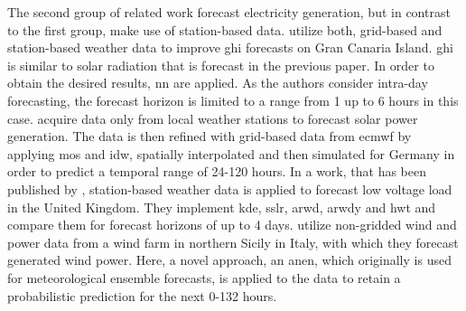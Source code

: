 The second group of related work forecast electricity generation, but in contrast to the first group, make use of station-based data. \Eg {} utilize both, grid-based and station-based weather data to improve \gls{ghi} forecasts on Gran Canaria Island. \gls{ghi} is similar to solar radiation that is forecast in the previous paper. In order to obtain the desired results, \gls{nn} are applied. As the authors consider intra-day forecasting, the forecast horizon is limited to a range from 1 up to 6 hours in this case.  acquire data only from local weather stations to forecast solar power generation. The data is then refined with grid-based data from \gls{ecmwf} by applying \gls{mos} and \gls{idw}, spatially interpolated and then simulated for Germany in order to predict a temporal range of 24-120 hours. In a work, that has been published by , station-based weather data is applied to forecast low voltage load in the United Kingdom. They implement \gls{kde}, \gls{sslr}, \gls{arwd}, \gls{arwdy} and \gls{hwt} and compare them for forecast horizons of up to 4 days.  utilize non-gridded wind and power data from a wind farm in northern Sicily in Italy, with which they forecast generated wind power. Here, a novel approach, an \gls{anen}, which originally is used for meteorological ensemble forecasts, is applied to the data to retain a probabilistic prediction for the next 0-132 hours.\\

